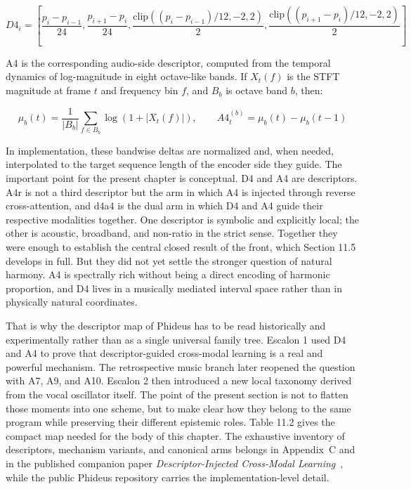 $$
D4_i = \left[
\frac{p_i - p_{i-1}}{24},
\frac{p_{i+1} - p_i}{24},
\frac{\mathrm{clip}((p_i - p_{i-1})/12, -2, 2)}{2},
\frac{\mathrm{clip}((p_{i+1} - p_i)/12, -2, 2)}{2}
\right]
$$

A4 is the corresponding audio-side descriptor, computed from the temporal dynamics of log-magnitude in eight octave-like bands. If \(X_t(f)\) is the STFT magnitude at frame \(t\) and frequency bin \(f\), and \(B_b\) is octave band \(b\), then:

$$
\mu_b(t) = \frac{1}{|B_b|}\sum_{f \in B_b} \log(1 + |X_t(f)|),
\qquad
A4_t^{(b)} = \mu_b(t) - \mu_b(t-1)
$$

In implementation, these bandwise deltas are normalized and, when needed, interpolated to the target sequence length of the encoder side they guide. The important point for the present chapter is conceptual. D4 and A4 are descriptors. A4r is not a third descriptor but the arm in which A4 is injected through reverse cross-attention, and d4a4 is the dual arm in which D4 and A4 guide their respective modalities together. One descriptor is symbolic and explicitly local; the other is acoustic, broadband, and non-ratio in the strict sense. Together they were enough to establish the central closed result of the front, which Section 11.5 develops in full. But they did not yet settle the stronger question of natural harmony. A4 is spectrally rich without being a direct encoding of harmonic proportion, and D4 lives in a musically mediated interval space rather than in physically natural coordinates.

That is why the descriptor map of Phideus has to be read historically and experimentally rather than as a single universal family tree. Escalon 1 used D4 and A4 to prove that descriptor-guided cross-modal learning is a real and powerful mechanism. The retrospective music branch later reopened the question with A7, A9, and A10. Escalon 2 then introduced a new local taxonomy derived from the vocal oscillator itself. The point of the present section is not to flatten those moments into one scheme, but to make clear how they belong to the same program while preserving their different epistemic roles. Table 11.2 gives the compact map needed for the body of this chapter. The exhaustive inventory of descriptors, mechanism variants, and canonical arms belongs in Appendix~C and in the published companion paper \emph{Descriptor-Injected Cross-Modal Learning}~\parencite{fernandez_2026_phideus}, while the public Phideus repository carries the implementation-level detail.

